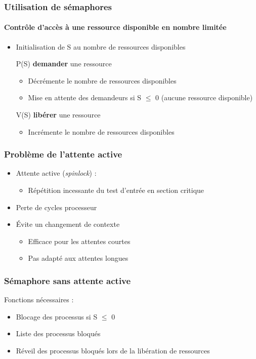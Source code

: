 \begin{frame}
\frametitle{Utilisation de sémaphores}
\framesubtitle{Contrôle d’accès à une ressource disponible en nombre limitée}
\begin{itemize}
\item Initialisation de S au nombre de ressources disponibles
\item [P(S)] \textbf{demander} une ressource
\begin{itemize}
\item Décrémente le nombre de ressources disponibles
\item Mise en attente des demandeurs si S $\leqslant$ 0 (aucune ressource disponible)
\end{itemize}
\item [V(S)] \textbf{libérer} une ressource
\begin{itemize}
\item Incrémente le nombre de ressources disponibles
\end{itemize}
\end{itemize}
\end{frame}

\begin{frame}
\frametitle{Problème de l’attente active}
\begin{itemize}
\item Attente active (\textit{spinlock}) : 
\begin{itemize}
\item Répétition incessante du test d'entrée en section critique
\end{itemize}
\item Perte de cycles processeur
\item Évite un changement de contexte
\begin{itemize}
\item Efficace pour les attentes courtes
\item Pas adapté aux attentes longues
\end{itemize}
\end{itemize}
\end{frame}

\begin{frame}
\frametitle{Sémaphore sans attente active}
Fonctions nécessaires :
\begin{itemize}
\item Blocage des processus si S $\leqslant$ 0
\item Liste des processus bloqués
\item Réveil des processus bloqués lors de la libération de ressources
\end{itemize}
\end{frame}

